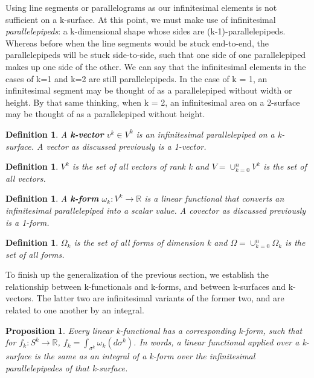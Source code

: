 \documentclass{book}
\newtheorem{defn}[equation]{Definition}
\newtheorem{prop}[equation]{Proposition}
\begin{document}
Using line segments or parallelograms as our infinitesimal elements is not sufficient on a k-surface. At this point, we must make use of infinitesimal \emph{parallelepipeds}: a k-dimensional shape whose sides are (k-1)-parallelepipeds. Whereas before when the line segments would be stuck end-to-end, the parallelepipeds will be stuck side-to-side, such that one side of one parallelepiped makes up one side of the other. We can say that the infinitesimal elements in the cases of k=1 and k=2 are still parallelepipeds. In the case of k = 1, an infinitesimal segment may be thought of as a parallelepiped without width or height. By that same thinking, when k = 2, an infinitesimal area on a 2-surface may be thought of as a parallelepiped without height. 



\begin{defn}
	A \textbf{k-vector} $v^k \in V^k$ is an infinitesimal parallelepiped on a k-surface. A vector as discussed previously is a 1-vector. 
\end{defn}


\begin{defn}
	$V^k$ is the set of all vectors of rank k and $V = \cup_{k=0}^n V^k$ is the set of all vectors. 
	\end{defn}
 

\begin{defn}
	A \textbf{k-form} $\omega_k : V^k \to \mathbb{R}$ is a linear functional that converts an infinitesimal parallelepiped into a scalar value. A covector as discussed previously is a 1-form. 
\end{defn}

\begin{defn}
	$\Omega_k$ is the set of all forms of dimension k and $\Omega = \cup_{k=0}^n\Omega_k$ is the set of all forms. 
\end{defn}



To finish up the generalization of the previous section, we establish the relationship between k-functionals and k-forms, and between k-surfaces and k-vectors. The latter two are infinitesimal variants of the former two, and are related to one another by an integral. 


\begin{prop}
	Every linear k-functional has a corresponding k-form, such that for $f_k : S^k \to \mathbb{R}$, $f_k = \int_{\sigma^k} \omega_k(d\sigma^k)$. In words, a linear functional applied over a k-surface is the same as an integral of a k-form over the infinitesimal parallelepipedes of that k-surface. 
\end{prop}
\end{document}
